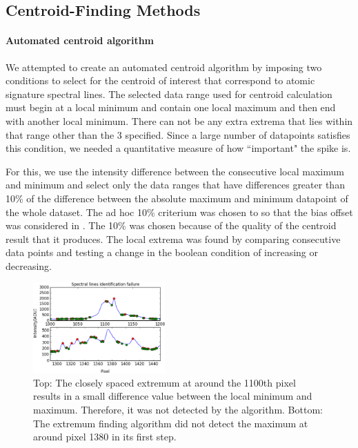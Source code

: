 \documentclass[authoryear, 12pt,5p, times]{elsarticle}
\begin{document}
	\subsection{Centroid-Finding Methods}
	\paragraph*{\textbf{Automated centroid algorithm}}
 We attempted to create an automated centroid algorithm by imposing two conditions to select for the centroid of interest that correspond to atomic signature spectral lines. The selected data range used for centroid calculation must begin at a local minimum and contain one local maximum and then end with another local minimum. There can not be any extra extrema that lies within that range other than the 3 specified. Since a large number of datapoints satisfies this condition, we needed a quantitative measure of how ``important" the spike is.  
 
 For this, we use the intensity difference between the consecutive  local maximum and minimum and select only the data ranges that  have  differences greater than 10\% of the difference between the absolute maximum and  minimum datapoint of the whole dataset. The ad hoc 10\% criterium was chosen to so that the bias offset  was considered in . The 10\% was chosen because of the quality of the centroid result that it produces. The local extrema was found by comparing consecutive data points and testing a change in the boolean condition of increasing or decreasing.
\begin{figure}
\includegraphics[width=0.45\textwidth]{figures/fail}
\caption{Top: The closely spaced extremum at around the 1100th pixel results in a small difference value between the local minimum and maximum. Therefore, it was not detected by the algorithm. Bottom: The extremum finding algorithm did not detect the maximum at around pixel 1380 in its  first step.}
\end{figure}
\end{document}
